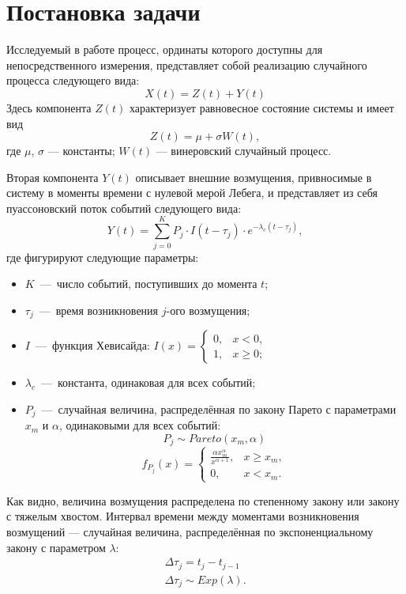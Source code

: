 \chapter{Постановка задачи}	%

Исследуемый в работе процесс, ординаты которого доступны для непосредственного измерения, представляет собой реализацию случайного процесса следующего вида:
\begin{equation}\label{eq:model}
X(t) = Z(t) + Y(t)
\end{equation}
Здесь компонента $Z(t)$ характеризует равновесное состояние системы и имеет вид
\begin{equation}\label{eq:mod_wiener}
Z(t) = \mu + \sigma W(t),
\end{equation}
где
$\mu$, $\sigma$ --- константы; $W(t)$ --- винеровский случайный процесс.

Вторая компонента $Y(t)$ описывает внешние возмущения, привносимые в систему в моменты времени с нулевой мерой Лебега, и представляет из себя пуассоновский поток событий следующего вида:
\begin{equation}\label{eq:mod_markovsky}
Y(t) = \sum_{j = 0}^K P_j \cdot I(t - \tau_j) \cdot e^{-\lambda_c(t - \tau_j)},
\end{equation}
где фигурируют следующие параметры:
\begin{itemize}
\item $K$~---~число событий, поступивших до момента $t$;
\item $\tau_j$~---~время возникновения $j$-ого возмущения;
\item $I$~---~функция Хевисайда: $I(x) = \begin{cases}
0, &x < 0, \\
1, &x \geq 0;
\end{cases}$
\item $\lambda_c$~---~константа, одинаковая для всех событий;
\item $P_j$~---~случайная величина, распределённая по закону Парето с параметрами $x_m$ и $\alpha$, одинаковыми для всех событий:
\[ P_j \sim Pareto(x_m, \alpha) \]
\[
f_{P_j}(x) = \begin{cases}
\frac{\alpha x_m^\alpha}{x^{\alpha+1} }, &x \geqslant x_m, \\
0, &x < x_m.
\end{cases}
\]
\end{itemize}
Как видно, величина возмущения распределена по степенному закону или закону с тяжелым хвостом.
Интервал времени между моментами возникновения возмущений --- случайная величина, распределённая по экспоненциальному закону с параметром $\lambda$:
\begin{gather}
\Delta \tau_j = t_j - t_{j-1} \\
\Delta \tau_j \sim Exp(\lambda).
\end{gather}

